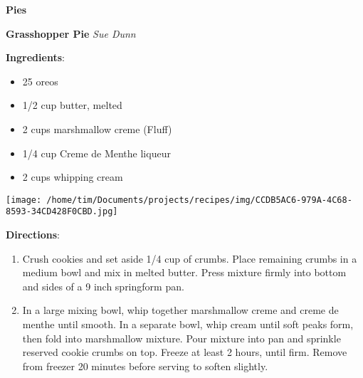 \documentclass[11pt, twoside, openany]{book}
\begin{document}
{\newpage \LARGE \textbf{Pies}} \label{pies}\\
\noindent\begin{minipage}[t]{\linewidth}%
{\Large\textbf{Grasshopper Pie}} \label{grasshopper-pie}\hfill\textit{Sue Dunn}\\
\noindent\begin{minipage}[t]{0.78\linewidth}%
\textbf{Ingredients}:\vspace{-3mm}
\begin{multicols}{2}
\begin{itemize}\setlength\itemsep{-1mm}
\item 25 oreos
\item 1/2 cup butter, melted
\item 2 cups marshmallow creme (Fluff)
\item 1/4 cup Creme de Menthe liqueur
\item 2 cups whipping cream
\end{itemize}
\end{multicols}
\end{minipage}
\noindent\begin{minipage}[t]{0.18\linewidth}
\centering \strut\vspace*{-\baselineskip}\newline
\texttt{[image: /home/tim/Documents/projects/recipes/img/CCDB5AC6-979A-4C68-8593-34CD428F0CBD.jpg]}\\
\end{minipage}\vspace{3mm}
\textbf{Directions}:
\vspace{-3mm}\begin{enumerate}\setlength\itemsep{-1mm}
\item Crush cookies and set aside 1/4 cup of crumbs. Place remaining crumbs in a medium bowl and mix in melted butter. Press mixture firmly into bottom and sides of a 9 inch springform pan.
\item In a large mixing bowl, whip together marshmallow creme and creme de menthe until smooth. In a separate bowl, whip cream until soft peaks form, then fold into marshmallow mixture. Pour mixture into pan and sprinkle reserved cookie crumbs on top. Freeze at least 2 hours, until firm. Remove from freezer 20 minutes before serving to soften slightly.
\end{enumerate}
\end{minipage}\vspace{8mm}
\end{document}
